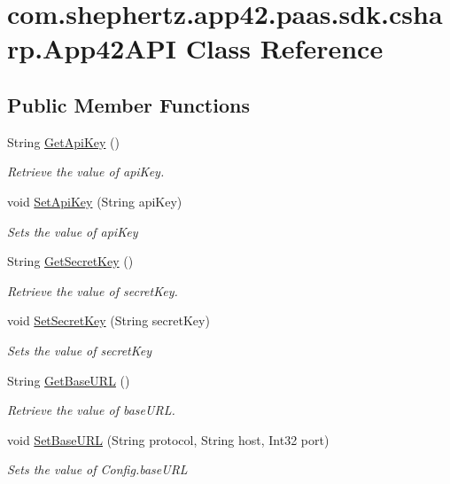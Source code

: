\hypertarget{classcom_1_1shephertz_1_1app42_1_1paas_1_1sdk_1_1csharp_1_1_app42_a_p_i}{\section{com.\+shephertz.\+app42.\+paas.\+sdk.\+csharp.\+App42\+A\+P\+I Class Reference}
\label{classcom_1_1shephertz_1_1app42_1_1paas_1_1sdk_1_1csharp_1_1_app42_a_p_i}
}
\subsection*{Public Member Functions}
\begin{DoxyCompactItemize}
\item 
String \hyperlink{classcom_1_1shephertz_1_1app42_1_1paas_1_1sdk_1_1csharp_1_1_app42_a_p_i_a709a59ee5d32a49b4a8790730e950d6c}{Get\+Api\+Key} ()
\begin{DoxyCompactList}\small\item\em Retrieve the value of api\+Key. \end{DoxyCompactList}\item 
void \hyperlink{classcom_1_1shephertz_1_1app42_1_1paas_1_1sdk_1_1csharp_1_1_app42_a_p_i_ad0dda95ed5fd510351f3ab972365ae41}{Set\+Api\+Key} (String api\+Key)
\begin{DoxyCompactList}\small\item\em Sets the value of api\+Key \end{DoxyCompactList}\item 
String \hyperlink{classcom_1_1shephertz_1_1app42_1_1paas_1_1sdk_1_1csharp_1_1_app42_a_p_i_a16d0ca7e18de6df13467acfffd3b1e47}{Get\+Secret\+Key} ()
\begin{DoxyCompactList}\small\item\em Retrieve the value of secret\+Key. \end{DoxyCompactList}\item 
void \hyperlink{classcom_1_1shephertz_1_1app42_1_1paas_1_1sdk_1_1csharp_1_1_app42_a_p_i_a303812d4a03c331a171a7eded7d9e962}{Set\+Secret\+Key} (String secret\+Key)
\begin{DoxyCompactList}\small\item\em Sets the value of secret\+Key \end{DoxyCompactList}\item 
String \hyperlink{classcom_1_1shephertz_1_1app42_1_1paas_1_1sdk_1_1csharp_1_1_app42_a_p_i_ac34dfbeaa05d86dfd85e8095b67bb4f8}{Get\+Base\+U\+R\+L} ()
\begin{DoxyCompactList}\small\item\em Retrieve the value of base\+U\+R\+L. \end{DoxyCompactList}\item 
void \hyperlink{classcom_1_1shephertz_1_1app42_1_1paas_1_1sdk_1_1csharp_1_1_app42_a_p_i_a1549e5fd09f430debce982f8a413c423}{Set\+Base\+U\+R\+L} (String protocol, String host, Int32 port)
\begin{DoxyCompactList}\small\item\em Sets the value of Config.\+base\+U\+R\+L \end{DoxyCompactList}\end{DoxyCompactItemize}
